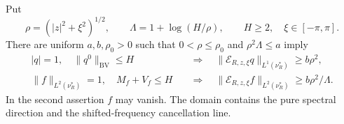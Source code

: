 \begin{theorem}
\label{thm:single-log-return-defect}
Put
\[
 \rho=(|z|^2+\xi^2)^{1/2},\qquad
 \Lambda=1+\log(H/\rho),\qquad H\ge2,
       \quad \xi\in[-\pi,\pi].
\]
There are uniform $a,b,\rho_0>0$ such that $0<\rho\le\rho_0$
and $\rho^2\Lambda\le a$ imply
\begin{align}
 |q|=1,\quad \|q^0\|_{\mathrm{BV}}\le H
 &\quad\Longrightarrow\quad
 \|\mathcal E_{R,z,\xi}q\|_{L^1(\nu_R^*)}\ge b\rho^2,
       \label{eq:single-log-circle}\\
 \|f\|_{L^2(\nu_R^*)}=1,\quad M_f+V_f\le H
 &\quad\Longrightarrow\quad
 \|\mathcal E_{R,z,\xi}f\|_{L^2(\nu_R^*)}
                    \ge b\rho^2/\Lambda.
       \label{eq:single-log-vector}
\end{align}
In the second assertion $f$ may vanish. The domain contains the pure
spectral direction and the shifted-frequency cancellation line.
\end{theorem}
